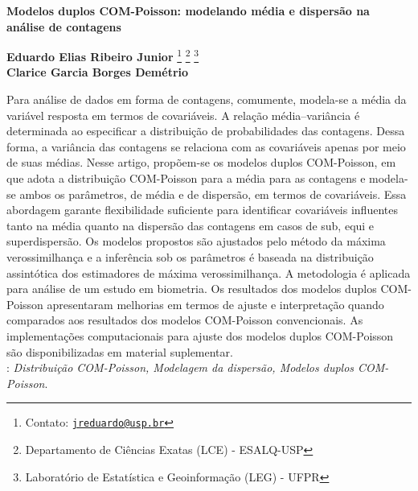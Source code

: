 \documentclass[12pt, a4paper]{article}
\begin{document}
\onehalfspacing

\begin{center}
  \textbf{
    \Large{Modelos duplos COM-Poisson: modelando média e dispersão
      na análise de contagens}
  } \\[1em]
\end{center}

\begin{flushright}
  {\bf Eduardo Elias Ribeiro Junior}
  \footnote[$\dagger$]{Contato:
    \href{mailto:jreduardo@usp.br}{\tt jreduardo@usp.br}}
  \footnote[1]{Departamento de Ciências Exatas (LCE) - ESALQ-USP}
  \footnote[2]{Laboratório de Estatística e Geoinformação (LEG) -
    UFPR}\\
  {\bf Clarice Garcia Borges Demétrio} \footnotemark[1]
\end{flushright}

\vspace*{0.5cm}

\noindent Para análise de dados em forma de contagens, comumente,
modela-se a média da variável resposta em termos de covariáveis. A
relação média--variância é determinada ao especificar a distribuição de
probabilidades das contagens. Dessa forma, a variância das contagens se
relaciona com as covariáveis apenas por meio de suas médias. Nesse
artigo, propõem-se os modelos duplos COM-Poisson, em que adota a
distribuição COM-Poisson para a média para as contagens e modela-se
ambos os parâmetros, de média e de dispersão, em termos de
covariáveis. Essa abordagem garante flexibilidade suficiente para
identificar covariáveis influentes tanto na média quanto na dispersão
das contagens em casos de sub, equi e superdispersão. Os modelos
propostos são ajustados pelo método da máxima verossimilhança e a
inferência sob os parâmetros é baseada na distribuição assintótica dos
estimadores de máxima verossimilhança. A metodologia é aplicada para
análise de um estudo em biometria. Os resultados dos modelos duplos
COM-Poisson apresentaram melhorias em termos de ajuste e interpretação
quando comparados aos resultados dos modelos COM-Poisson
convencionais. As implementações computacionais para ajuste dos modelos
duplos COM-Poisson são disponibilizadas em material
suplementar.\\

:
{\it Distribuição COM-Poisson, Modelagem da dispersão,
     Modelos duplos COM-Poisson}.\\
\end{document}
